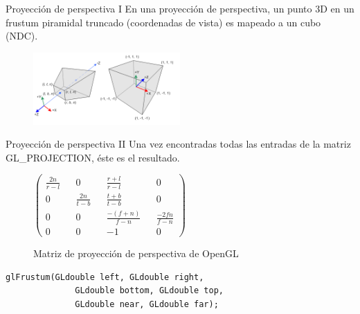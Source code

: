 \documentclass{beamer}
\begin{document}
\begin{frame}{Proyección de perspectiva I}
  En una proyección de perspectiva, un punto 3D en un frustum piramidal truncado (coordenadas de vista) es mapeado a un cubo (NDC).
    \begin{figure}[h]
    \centering
    \includegraphics[width=0.5\textwidth]{img/gl_projectionmatrix01}
  \end{figure}

\end{frame}
\begin{frame}[fragile]{Proyección de perspectiva II}
  Una vez encontradas todas las entradas de la matriz GL\_PROJECTION, éste es el resultado.
  \begin{figure} [h]
  \(
  \begin{pmatrix}
    \frac{2n}{r-l} &&              0 &&   \frac{r+l}{r-l} &&                0 \\
                 0 && \frac{2n}{t-b} &&   \frac{t+b}{t-b} &&                0 \\
                 0 &&              0 && \frac{-(f+n)}{f-n} && \frac{-2fn}{f-n} \\
                 0 &&              0 &&                -1 &&                0
  \end{pmatrix}
  \)
  \caption*{Matriz de proyección de perspectiva de OpenGL}
  \end{figure}
  \begin{lstlisting}[xleftmargin=10pt]
    glFrustum(GLdouble left, GLdouble right,
              GLdouble bottom, GLdouble top,
              GLdouble near, GLdouble far);
  \end{lstlisting}
\end{frame}
\end{document}
